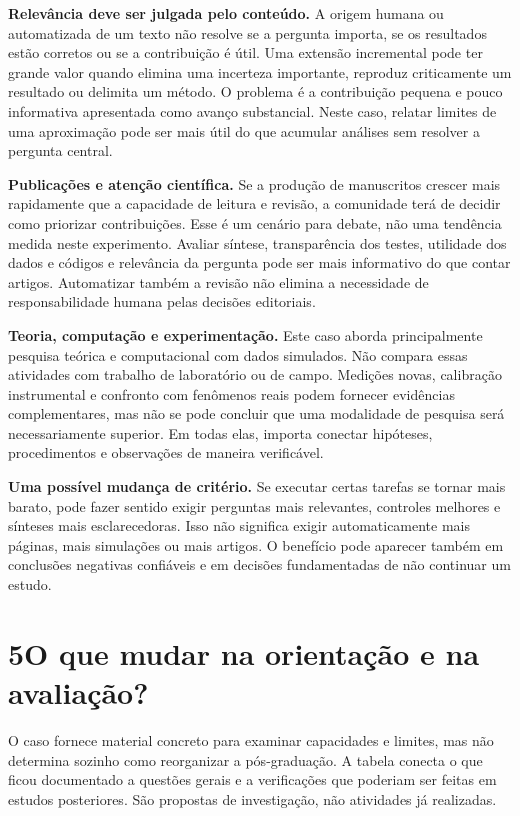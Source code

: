 \documentclass[11pt,a4paper]{article}
\newcommand{\titulo}[2]{\section*{\color{navy}#1\quad #2}}
\begin{document}
\textbf{Relevância deve ser julgada pelo conteúdo.} A origem humana ou automatizada de um texto não resolve se a pergunta importa, se os resultados estão corretos ou se a contribuição é útil. Uma extensão incremental pode ter grande valor quando elimina uma incerteza importante, reproduz criticamente um resultado ou delimita um método. O problema é a contribuição pequena e pouco informativa apresentada como avanço substancial. Neste caso, relatar limites de uma aproximação pode ser mais útil do que acumular análises sem resolver a pergunta central.

\textbf{Publicações e atenção científica.} Se a produção de manuscritos crescer mais rapidamente que a capacidade de leitura e revisão, a comunidade terá de decidir como priorizar contribuições. Esse é um cenário para debate, não uma tendência medida neste experimento. Avaliar síntese, transparência dos testes, utilidade dos dados e códigos e relevância da pergunta pode ser mais informativo do que contar artigos. Automatizar também a revisão não elimina a necessidade de responsabilidade humana pelas decisões editoriais.

\textbf{Teoria, computação e experimentação.} Este caso aborda principalmente pesquisa teórica e computacional com dados simulados. Não compara essas atividades com trabalho de laboratório ou de campo. Medições novas, calibração instrumental e confronto com fenômenos reais podem fornecer evidências complementares, mas não se pode concluir que uma modalidade de pesquisa será necessariamente superior. Em todas elas, importa conectar hipóteses, procedimentos e observações de maneira verificável.

\begin{destaque}
\textbf{Uma possível mudança de critério.} Se executar certas tarefas se tornar mais barato, pode fazer sentido exigir perguntas mais relevantes, controles melhores e sínteses mais esclarecedoras. Isso não significa exigir automaticamente mais páginas, mais simulações ou mais artigos. O benefício pode aparecer também em conclusões negativas confiáveis e em decisões fundamentadas de não continuar um estudo.
\end{destaque}
\newpage

\titulo{5}{O que mudar na orientação e na avaliação?}
O caso fornece material concreto para examinar capacidades e limites, mas não determina sozinho como reorganizar a pós-graduação. A tabela conecta o que ficou documentado a questões gerais e a verificações que poderiam ser feitas em estudos posteriores. São propostas de investigação, não atividades já realizadas.
\end{document}

